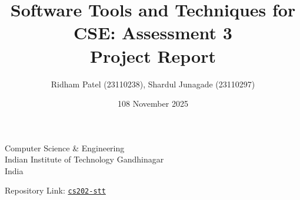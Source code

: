 \documentclass{article}
\title{Software Tools and Techniques for CSE: Assessment 3 \\[1ex] \large Project Report}
\author{Ridham Patel (23110238), Shardul Junagade (23110297)}
\date{108 November 2025}
\begin{document}
\maketitle

\begin{center}
    Computer Science \& Engineering\\
    Indian Institute of Technology Gandhinagar\\
    India


\end{center}

\begin{center}
{\large Repository Link: \href{https://github.com/ShardulJunagade/cs202-stt/}{\texttt{cs202-stt}}}
\end{center}

\tableofcontents
\pagebreak



\newpage



\end{document}
